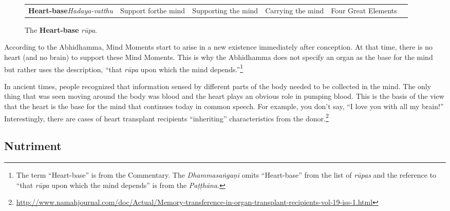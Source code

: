 \begin{figure} [H]
\setlength{\tabcolsep}{0pt}
\renewcommand{\arraystretch}{1.1}
\noindent\begin{tabular}{P{0.25\textwidth} | C{.185\textwidth} C{0.185\textwidth} C{0.185\textwidth} C{0.195\textwidth} m{0mm}}
\toprule
 &  &  &  & \\
\midrule
\textbf{Heart-base}\newline \textit{Hadaya-vatthu} & Support for\newline the mind & Supporting the mind & Carrying the mind & Four Great Elements &\\[9mm]
\bottomrule
\end{tabular} 
\caption[]{The \textbf{Heart-base} \textit{rūpa}.\footnotemark}
\end{figure}


According to the Abhidhamma, Mind Moments start to arise in a new existence immediately after conception. At that time, there is no heart (and no brain) to support these Mind Moments. This is why the Abhidhamma does not specify an organ as the base for the mind but rather uses the description, “that \textit{rūpa} upon which the mind depends.”\footnote{The term “Heart-base” is from the Commentary. The \textit{Dhammasaṅgaṇī} omits “Heart-base” from the list of \textit{rūpas} and the reference to “that \textit{rūpa} upon which the mind depends” is from the \textit{Paṭṭhāna}.}

In ancient times, people recognized that information sensed by different parts of the body needed to be collected in the mind. The only thing that was seen moving around the body was blood and the heart plays an obvious role in pumping blood. This is the basis of the view that the heart is the base for the mind that continues today in common speech. For example, you don’t say, “I love you with all my brain!” Interestingly, there are cases of heart transplant recipients “inheriting” characteristics from the donor.\footnote{\url{http://www.namahjournal.com/doc/Actual/Memory-transference-in-organ-transplant-recipients-vol-19-iss-1.html}}

\subsection*{Nutriment}

